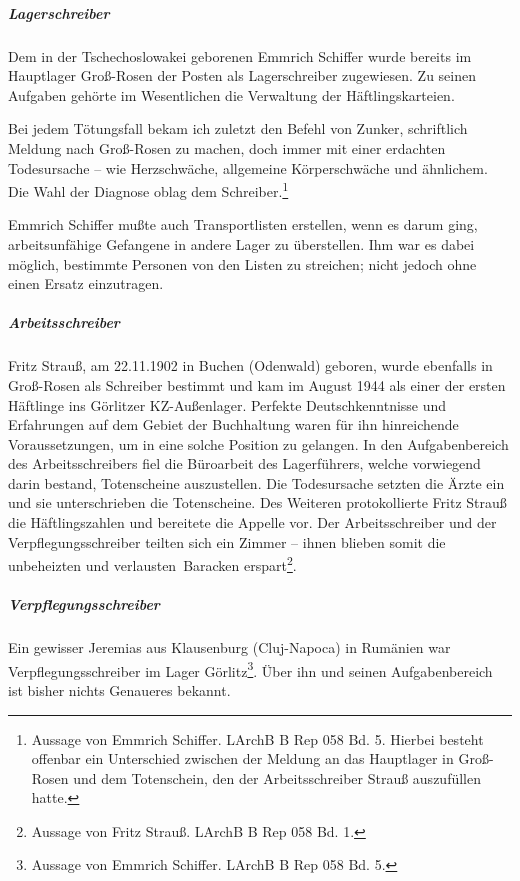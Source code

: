 \subparagraph{Lagerschreiber}
Dem in der Tschechoslowakei geborenen \mbox{Emmrich} Schiffer wurde bereits im Hauptlager Groß-Rosen der Posten als Lagerschreiber zugewiesen. Zu seinen Aufgaben gehörte im Wesentlichen die Verwaltung der Häftlingskarteien.
\begin{leftbar}
Bei jedem Tötungsfall bekam ich zuletzt den Befehl von Zunker, schriftlich Meldung nach Groß-Rosen zu machen, doch immer mit einer erdachten Todesursache -- wie Herzschwäche, allgemeine Körperschwäche und ähnlichem. Die Wahl der Diagnose oblag dem Schreiber.\footnote{Aussage von Emmrich Schiffer. LArchB B Rep 058 Bd. 5. Hierbei besteht offenbar ein Unterschied zwischen der Meldung an das Hauptlager in Groß-Rosen und dem Totenschein, den der Arbeitsschreiber Strauß  auszufüllen hatte.}
\end{leftbar}
Emmrich Schiffer mußte auch Transportlisten erstellen, wenn es darum ging, arbeitsunfähige Gefangene in andere Lager zu  überstellen. Ihm war es dabei möglich, bestimmte Personen von den Listen zu streichen; nicht jedoch ohne einen Ersatz einzutragen.


\subparagraph{Arbeitsschreiber}
Fritz Strauß, am 22.11.1902 in Buchen (Odenwald) geboren, wurde ebenfalls in Groß-Rosen als Schreiber bestimmt und kam im August 1944 als einer der ersten Häftlinge ins Görlitzer KZ-Außenlager. Perfekte Deutschkenntnisse und Erfahrungen auf dem Gebiet der Buchhaltung waren für ihn hinreichende Voraussetzungen, um in eine solche Position zu gelangen.
In den Aufgabenbereich des Arbeitsschreibers fiel die Büroarbeit des Lagerführers, welche vorwiegend darin bestand, Totenscheine auszustellen. Die Todesursache setzten die Ärzte ein und sie unterschrieben die Totenscheine. Des Weiteren protokollierte Fritz Strauß die Häftlingszahlen und bereitete die Appelle vor.\newline
Der Arbeitsschreiber und der Verpflegungsschreiber teilten sich ein Zimmer -- ihnen blieben somit die unbeheizten und \glqq verlausten\grqq~Baracken erspart\footnote{Aussage von Fritz Strauß. LArchB B Rep 058 Bd. 1.}.

\subparagraph{Verpflegungsschreiber}
Ein gewisser Jeremias aus Klausenburg (Cluj-Napoca) in Rumänien war Verpflegungsschreiber im Lager Görlitz\footnote{Aussage von Emmrich Schiffer. LArchB B Rep 058 Bd. 5.}.
Über ihn und seinen Aufgabenbereich ist bisher nichts Genaueres bekannt.

